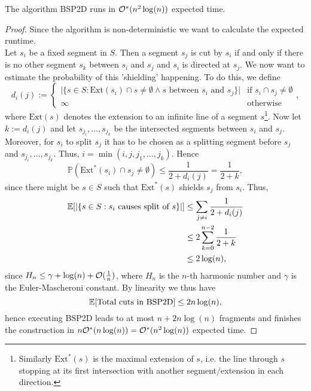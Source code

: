     \begin{theorem}
        The algorithm BSP2D runs in $\mathcal{O}^\ast(n^2\log(n))$ expected time.
    \end{theorem}
    \begin{proof}
        Since the algorithm is non-deterministic we want to calculate the expected runtime. \\
        Let $s_i$ be a fixed segment in $S$. Then a segment $s_j$ is cut by $s_i$ if and only if there is no other segment $s_k$ between $s_i$ and $s_j$ and $s_i$ is directed at $s_j$. We now want to estimate the probability of this 'shielding' happening. To do this, we define
        $$d_i(j) := \begin{cases} \vert \{s \in S : \text{Ext}(s_i) \cap s \neq \emptyset \land s \text{ between } s_i \text{ and } s_j \}\vert &\text{if } s_i \cap s_j \neq \emptyset \\ \infty &\text{otherwise} \end{cases} ,$$
        where $\text{Ext}(s)$ denotes the extension to an infinite line of a segment $s$\footnote{Similarly $\text{Ext}^\ast(s)$ is the maximal extension of $s$, i.e. the line through $s$ stopping at its first intersection with another segment/extension in each direction.}. Now let $k := d_i(j)$ and let $s_{j_i}, \dots, s_{j_k}$ be the intersected segments between $s_i$ and $s_j$. Moreover, for $s_i$ to split $s_j$ it has to be chosen as a splitting segment before $s_j$ and $s_{j_i}, \dots, s_{j_k}$. Thus, $i = \min(i, j, j_1, \dots, j_k)$. Hence
        $$\mathbb{P}(\text{Ext}^\ast(s_i) \cap s_j \neq \emptyset) \leq \frac{1}{2 + d_i(j)} = \frac{1}{2 + k} ,$$
        since there might be $s \in S$ such that $\text{Ext}^\ast(s)$ shields $s_j$ from $s_i$. Thus,
        \begin{align*}
            \mathbb{E}[\vert \{s \in S : s_i \text{ causes split of } s\} \vert] &\leq \sum_{j \neq i} \frac{1}{2 + d_i(j)} \\
            &\leq 2\sum_{k = 0}^{n-2} \frac{1}{2 + k} \\
            &\leq 2\log(n),
        \end{align*}
        since $H_n \leq \gamma + \log(n) + \mathcal{O}(\frac{1}{n})$, where $H_n$ is the $n$-th harmonic number and $\gamma$ is the Euler-Mascheroni constant. By linearity we thus have
        $$\mathbb{E}[\text{Total cuts in BSP2D}] \leq 2n\log(n) ,$$
        hence executing BSP2D leads to at most $n + 2n\log(n)$ fragments and finishes the construction in $n\mathcal{O}^\ast(n\log(n)) = \mathcal{O}^\ast(n^2\log(n))$ expected time.
    \end{proof} 

